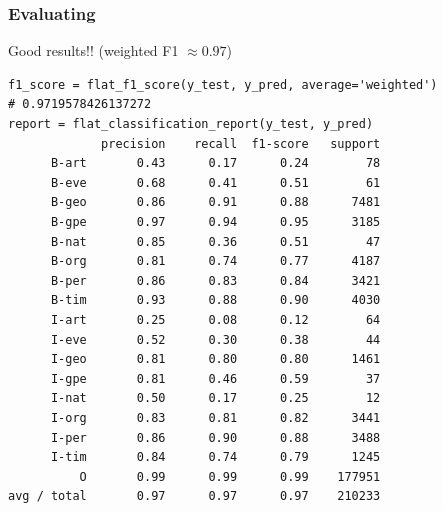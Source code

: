 \begin{frame}[fragile]\frametitle{Evaluating}
Good results!! (weighted F1 $\approx 0.97$)
\begin{lstlisting}
f1_score = flat_f1_score(y_test, y_pred, average='weighted')
# 0.9719578426137272
report = flat_classification_report(y_test, y_pred)
             precision    recall  f1-score   support
      B-art       0.43      0.17      0.24        78
      B-eve       0.68      0.41      0.51        61
      B-geo       0.86      0.91      0.88      7481
      B-gpe       0.97      0.94      0.95      3185
      B-nat       0.85      0.36      0.51        47
      B-org       0.81      0.74      0.77      4187
      B-per       0.86      0.83      0.84      3421
      B-tim       0.93      0.88      0.90      4030
      I-art       0.25      0.08      0.12        64
      I-eve       0.52      0.30      0.38        44
      I-geo       0.81      0.80      0.80      1461
      I-gpe       0.81      0.46      0.59        37
      I-nat       0.50      0.17      0.25        12
      I-org       0.83      0.81      0.82      3441
      I-per       0.86      0.90      0.88      3488
      I-tim       0.84      0.74      0.79      1245
          O       0.99      0.99      0.99    177951
avg / total       0.97      0.97      0.97    210233
\end{lstlisting}
\end{frame}